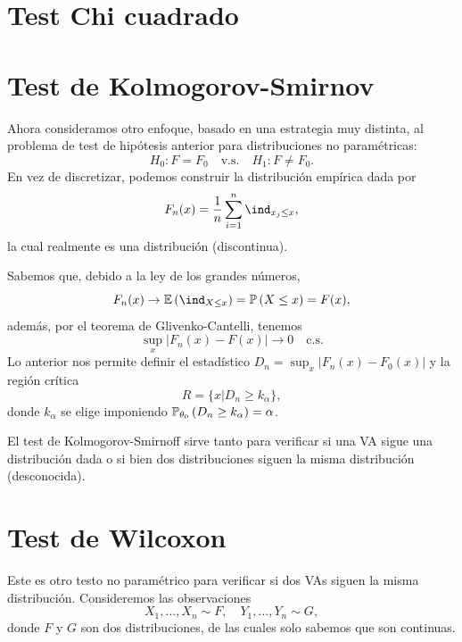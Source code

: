  \section{Test Chi cuadrado} 


 \section{Test de Kolmogorov-Smirnov} 
\label{sub:test_KS}

Ahora consideramos otro enfoque, basado en una estrategia muy distinta, al problema de test de hipótesis anterior para distribuciones no paramétricas:
	\begin{equation}
		H_0:F=F_0\quad \text{v.s.}\quad H_1:F\neq F_0.
	\end{equation}
En vez de discretizar, podemos construir la distribución empírica dada por 
\begin{equation}
	F_n(x) = \frac{1}{n}\sum_{i=1}^n\ind_{x_j\leq x}, 
\end{equation}
la cual realmente es una distribución (discontinua). 

Sabemos que, debido a la ley de los grandes números, 
\begin{equation}
	F_n(x)\to \E{\ind_{X\leq x}} = \Prob{X\leq x} =  F(x),
\end{equation}
además, por el teorema de Glivenko-Cantelli, tenemos 
\begin{equation}
	\sup_x|F_n(x)-F(x)| \to 0 \quad\text{c.s.}
\end{equation}
Lo anterior nos permite definir el estadístico  $D_n = \sup_x|F_n(x)-F_0(x)|$ y la región crítica
\begin{equation}
	R = \{x|D_n\geq k_\alpha\},
\end{equation}
donde $k_\alpha$ se elige imponiendo $\mathbb{P}_{\theta_0} \left(D_n\geq  k_\alpha\right)=\alpha$.

\begin{remark}
El test de  Kolmogorov-Smirnoff sirve tanto para verificar si una VA sigue una distribución dada o si bien dos distribuciones siguen la misma distribución (desconocida).
\end{remark}

 \section{Test de Wilcoxon} 
\label{sub:test_Wilc}

Este es otro testo no paramétrico para verificar si dos VAs siguen la misma distribución. Consideremos las observaciones 
\begin{equation}
	X_1,\ldots,X_n\sim F,\quad Y_1,\ldots,Y_n\sim G,
\end{equation}
donde $F$ y $G$ son dos distribuciones, de las cuales solo sabemos que son continuas. 

